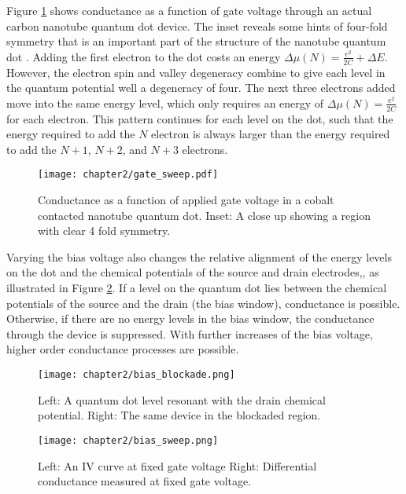 Figure \ref{fig:real_gate} shows conductance as a function of gate voltage through an actual carbon nanotube quantum dot device. The inset reveals some hints of four-fold symmetry that is an important part of the structure of the nanotube quantum dot \cite{Cobden2002}. Adding the first electron to the dot costs an energy $ \Delta \mu(N) = \frac{e^2}{2C} + \Delta E$. However, the electron spin and valley degeneracy combine to give each level in the quantum potential well a degeneracy of four. The next three electrons added move into the same energy level, which only requires an energy of $\Delta \mu(N) = \frac{e^2}{2C}$ for each electron. This pattern continues for each level on the dot, such that the energy required to add the $N$ electron is always larger than the energy required to add the $N+1$, $N+2$, and $N+3$ electrons.

\begin{figure}
    \centering
    \texttt{[image: chapter2/gate\_sweep.pdf]}
    \caption{Conductance as a function of applied gate voltage in a cobalt contacted nanotube quantum dot. Inset: A close up showing a region with clear 4 fold symmetry.}
    \label{fig:real_gate}
\end{figure}

Varying the bias voltage also changes the relative alignment of the energy levels on the dot and the chemical potentials of the source and drain electrodes,, as illustrated in Figure \ref{fig:bias_blockade}. If a level on the quantum dot lies between the chemical potentials of the source and the drain (the bias window), conductance is possible. Otherwise, if there are no energy levels in the bias window, the conductance through the device is suppressed. With further increases of the bias voltage, higher order conductance processes are possible. 

\begin{figure}
    \centering
    \texttt{[image: chapter2/bias\_blockade.png]}
    \caption{Left: A quantum dot level resonant with the drain chemical potential. Right: The same device in the blockaded region.}
    \label{fig:bias_blockade}
\end{figure}

\begin{figure}
    \centering
    \texttt{[image: chapter2/bias\_sweep.png]}
    \caption{Left: An IV curve at fixed gate voltage Right: Differential conductance measured at fixed gate voltage.}
    \label{fig:real_bias}
\end{figure}

